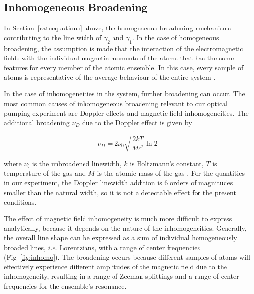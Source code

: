 \subsection{Inhomogeneous Broadening}\label{inhomogeneousbroadening}

In Section~\ref{rateequations} above, the homogeneous broadening
mechanisms contributing to the line width of $\gamma_2$ and
$\gamma_1$. In the case of homogeneous broadening, the assumption is
made that the interaction of the electromagnetic fields with the
individual magnetic moments of the atoms that has the same features
for every member of the atomic ensemble. In this case, every sample of
atoms is representative of the average behaviour of the entire system
\cite{vanier}. 

In the case of inhomogeneities in the system, further broadening can
occur. The most common causes of inhomogeneous broadening relevant to
our optical pumping experiment are Doppler effects and magnetic field
inhomogeneities. The additional broadening $\nu_D$ due to the Doppler effect
is given by

\begin{equation}
\nu_D = 2\nu_0\sqrt{\frac{2 k T}{M c^2}\ln{2}}
\end{equation}

where $\nu_0$ is the unbroadened linewidth, $k$ is Boltzmann's
constant, $T$ is temperature of the gas and $M$ is the atomic mass of
the gas \cite{yariv}. For the quantities in our experiment, the
Doppler linewidth addition is $6$ orders of magnitudes smaller than
the natural width, so it is not a detectable effect for the present
conditions.

The effect of magnetic field inhomogeneity is much more difficult to
express analytically, because it depends on the nature of the
inhomogeneities. Generally, the overall line shape can be expressed as
a sum of individual homogeneously broaded lines, $i.e.$ Lorentzians,
with a range of center frequencies
(Fig~\ref{fig:inhomo})\cite{vanier}. The broadening occurs because
different samples of atoms will effectively experience different
amplitudes of the magnetic field due to the inhomogeneity,
resulting in a range of Zeeman splittings and a range of center
frequencies for the ensemble's resonance.

